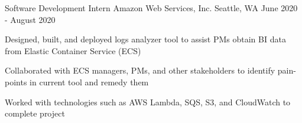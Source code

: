 

\begin{cventries}


  \cventry
    {Software Development Intern}
    {Amazon Web Services, Inc.}
    {Seattle, WA}
    {June 2020 - August 2020}
    {
      \begin{cvitems}
        \item {Designed, built, and deployed logs analyzer tool to assist PMs obtain BI data from Elastic Container Service (ECS)}
        \item {Collaborated with ECS managers, PMs, and other stakeholders to identify pain-points in current tool and remedy them}
        \item {Worked with technologies such as AWS Lambda, SQS, S3, and CloudWatch to complete project}
      \end{cvitems}
    }


\end{cventries}
